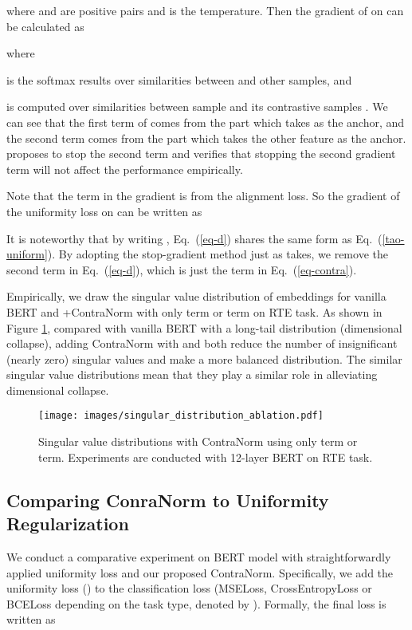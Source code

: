 \documentclass{article}
\theoremstyle{definition}
\theoremstyle{remark}
\theoremstyle{theorem}
\begin{document}
where  and  are positive pairs and  is the temperature. Then the gradient of  on  can be calculated as

where

is the softmax results over similarities between  and other samples, and

is computed over similarities between sample  and its contrastive samples . We can see that the first term of  comes from the part which takes  as the anchor, and the second term comes from the part which takes the other feature as the anchor. \cite{tao2022exploring} proposes to stop the second term and verifies that stopping the second gradient term will not affect the performance empirically.

Note that the  term in the gradient is from the alignment loss. So the gradient of the uniformity loss on  can be written as

It is noteworthy that by writing , Eq.~(\ref{eq-d}) shares the same form as Eq.~(\ref{tao-uniform}). By adopting the stop-gradient method just as \cite{tao2022exploring} takes, we remove the second term in Eq.~(\ref{eq-d}), which is just the  term in Eq.~(\ref{eq-contra}). 

Empirically, we draw the singular value distribution of embeddings for vanilla BERT and +ContraNorm with only  term or  term on RTE task. As shown in Figure \ref{fig:singular-ablation}, compared with vanilla BERT with a long-tail distribution (dimensional collapse), adding ContraNorm with  and  both reduce the number of insignificant (nearly zero) singular values and make a more balanced distribution. The similar singular value distributions mean that they play a similar role in alleviating dimensional collapse. 

\begin{figure}[h]
    \centering
    \texttt{[image: images/singular\_distribution\_ablation.pdf]}
    \caption{Singular value distributions with ContraNorm using only  term or  term. Experiments are conducted with 12-layer BERT on RTE task.}
    \label{fig:singular-ablation}
\end{figure}

\subsection{Comparing ConraNorm to Uniformity Regularization} \label{appen:uniformity}
We conduct a comparative experiment on BERT model with straightforwardly applied uniformity loss and our proposed ContraNorm. Specifically, we add the uniformity loss () to the classification loss (MSELoss, CrossEntropyLoss or BCELoss depending on the task type, denoted by ). Formally, the final loss is written as
\end{document}
